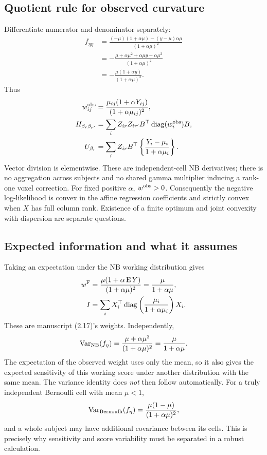 \documentclass[11pt,a4paper]{article}
\newcommand{\E}{\operatorname{E}}
\newcommand{\Var}{\operatorname{Var}}
\newcommand{\diag}{\operatorname{diag}}
\numberwithin{equation}{section}
\begin{document}
\subsection{Quotient rule for observed curvature}
Differentiate numerator and denominator separately:
\begin{align}
 f_{\eta\eta}
 &=\frac{(-\mu)(1+\alpha\mu)-(y-\mu)\alpha\mu}
           {(1+\alpha\mu)^2}\\
 &=-\frac{\mu+\alpha\mu^2+\alpha\mu y-\alpha\mu^2}
                {(1+\alpha\mu)^2}\\
 &=-\frac{\mu(1+\alpha y)}{(1+\alpha\mu)^2}.
\end{align}
Thus
\begin{align}
 w_{ij}^{\rm obs}
 &=\frac{\mu_{ij}(1+\alpha Y_{ij})}{(1+\alpha\mu_{ij})^2},\\
 H_{\beta_r\beta_{r'}}
 &=\sum_i Z_{ir}Z_{ir'} B^\top\diag(w_i^{\rm obs})B,\\
 U_{\beta_r}
 &=\sum_iZ_{ir}B^\top
          \left\{\frac{Y_i-\mu_i}{1+\alpha\mu_i}\right\}.
 \label{lesion-nb-full}
\end{align}
Vector division is elementwise. These are independent-cell NB
derivatives; there is no aggregation across subjects and no shared
gamma multiplier inducing a rank-one voxel correction.
For fixed positive $\alpha$, $w^{\rm obs}>0$.
Consequently the negative log-likelihood is convex in the affine
regression coefficients and strictly convex when $X$ has full column
rank. Existence of a finite optimum and joint convexity with dispersion
are separate questions.

\subsection{Expected information and what it assumes}
Taking an expectation under the NB working distribution gives
\begin{align}
 w^{\rm F}
 &=\frac{\mu(1+\alpha\E Y)}{(1+\alpha\mu)^2}
   =\frac{\mu}{1+\alpha\mu},\\
 I&=\sum_i X_i^\top\diag\left(\frac{\mu_i}{1+\alpha\mu_i}\right)X_i.
 \label{lesion-nb-fisher}
\end{align}
These are manuscript (2.17)'s weights. Independently,
\[
 \Var_{\rm NB}(f_\eta)
 =\frac{\mu+\alpha\mu^2}{(1+\alpha\mu)^2}
 =\frac{\mu}{1+\alpha\mu}.
\]
The expectation of the observed weight uses only the mean, so it
also gives the expected sensitivity of this working score under
another distribution with the same mean.
The variance identity does \emph{not} then follow automatically.
For a truly independent Bernoulli cell with mean $\mu<1$,
\[
 \Var_{\rm Bernoulli}(f_\eta)
 =\frac{\mu(1-\mu)}{(1+\alpha\mu)^2},
\]
and a whole subject may have additional covariance between its cells.
This is precisely why sensitivity and score variability must be
separated in a robust calculation.
\end{document}
